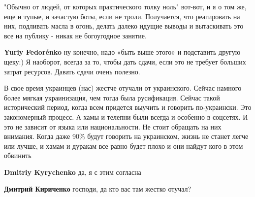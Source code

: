 \begin{itemize}
\begin{itemize}
"Обычно от людей, от которых практического толку ноль" вот-вот, и я о том же, еще и тупые, и зачастую боты, если не троли.
Получается, что реагировать на них, подливать масла в огонь, делать далеко идущие выводы и вытаскивать это все на публику - никак не богоугодное занятие.

 
\textbf{Yuriy Fedorénko} ну конечно, надо «быть выше этого» и подставить другую щеку:) Я наоборот, всегда за то, чтобы дать сдачи, если это не требует больших затрат ресурсов. Давать сдачи очень полезно.
\end{itemize}

 

В свое время украинцев (нас) жестче отучали от украинского. Сейчас намного
более мягкая украинизация, чем тогда была русификация. Сейчас такой
исторический период, когда всем придется выучить и говорить по-украински. Это
закономерный процесс. А хамы и телепни были всегда и особенно в соцсетях. И это
не зависит от языка или национальности. Не стоит обращать на них внимания.
Когда даже 90\% будут говорить на украинском, жизнь не станет легче или лучше, и
хамам и дуракам все равно будет плохо и они найдут кого в этом обвинить

\begin{itemize}
 
\textbf{Dmitriy Kyrychenko} да, я с этим согласна

 
\textbf{Дмитрий Кириченко} господи, да кто вас там жестко отучал?
\end{itemize}

 


\end{itemize}
